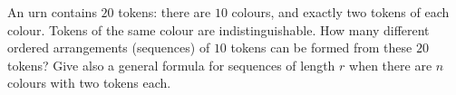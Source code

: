 An urn contains $20$ tokens: there are $10$ colours, and exactly two tokens of each colour. Tokens of the same colour are indistinguishable. How many different ordered arrangements (sequences) of $10$ tokens can be formed from these $20$ tokens? Give also a general formula for sequences of length $r$ when there are $n$ colours with two tokens each.
